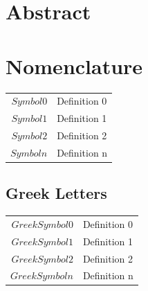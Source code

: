 \documentclass[12pt, letterpaper]{article}
\begin{document}
	\onehalfspacing %
	\setlength{\parskip}{1em} %
	\setcounter{page}{2} %

	\section*{Abstract}\hspace{2.6ex}\label{Abstract}
		\lipsum[23-25] %
		\newpage
	
	\tableofcontents
	\newpage
	
	\listoffigures
	\listoftables
	\newpage
        
	\section*{Nomenclature}\label{}
		\begin{table}[ht!]
			\label{}
			\begin{tabular}{r l}
				$Symbol 0$& Definition 0\\
				$Symbol 1$& Definition 1\\
				$Symbol 2$& Definition 2\\
				$Symbol n$& Definition n\\
			\end{tabular}
		\end{table}
		\subsection*{Greek Letters}
			\begin{table}[ht!]
				\label{}
				\begin{tabular}{r l}
					$Greek Symbol 0$& Definition 0\\  
					$Greek Symbol 1$& Definition 1\\  
					$Greek Symbol 2$& Definition 2\\
					$Greek Symbol n$& Definition n\\
				\end{tabular}
			\end{table}
	\newpage
        
\end{document}
